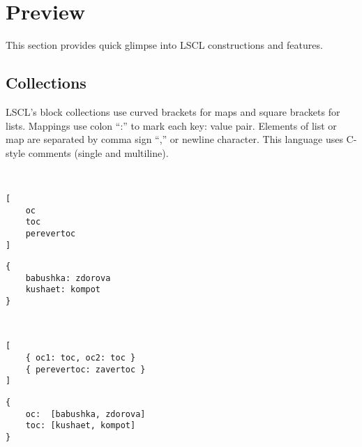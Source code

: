 
\section{Preview}
This section provides quick glimpse into LSCL constructions and features.

\subsection{Collections}
LSCL's block collections use curved brackets for maps and square brackets for lists. Mappings use colon ``:'' to mark each key: value pair. Elements of list or map are separated by comma sign ``,'' or newline character. This language uses C-style comments (single and multiline).

~\\
\begin{minipage}{0.45\textwidth}
\begin{lstlisting}[caption = list]
[
	oc
	toc
	perevertoc
]
\end{lstlisting}
\end{minipage}
\hfill
\begin{minipage}{0.45\textwidth}
\begin{lstlisting}[caption = map]
{
	babushka: zdorova
	kushaet: kompot
}
\end{lstlisting}
\end{minipage}

~\\
\begin{minipage}{0.45\textwidth}
\begin{lstlisting}[caption = list of maps]
[
	{ oc1: toc, oc2: toc }
	{ perevertoc: zavertoc }
]
\end{lstlisting}
\end{minipage}
\hfill
\begin{minipage}{0.45\textwidth}
\begin{lstlisting}[caption = map of lists]
{
	oc:  [babushka, zdorova]
	toc: [kushaet, kompot]
}
\end{lstlisting}
\end{minipage}

